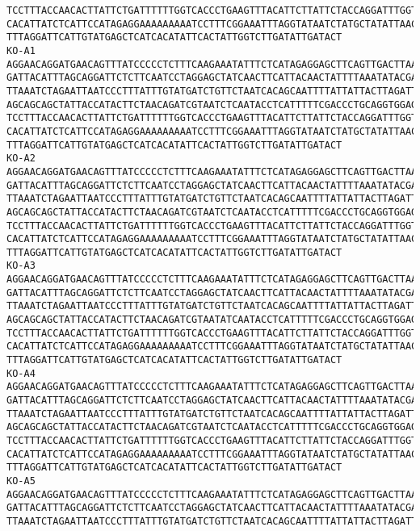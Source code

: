 \documentclass[11pt]{article}
\begin{document}
\begin{Verbatim}[commandchars=\\\{\}]
TCCTTTACCAACACTTATTCTGATTTTTTGGTCACCCTGAAGTTTACATTCTTATTCTACCAGGATTTGGTATTATTTCT
CACATTATCTCATTCCATAGAGGAAAAAAAAATCCTTTCGGAAATTTAGGTATAATCTATGCTATATTAACTATTGGAAT
TTTAGGATTCATTGTATGAGCTCATCACATATTCACTATTGGTCTTGATATTGATACT
KO-A1
AGGAACAGGATGAACAGTTTATCCCCCTCTTTCAAGAAATATTTCTCATAGAGGAGCTTCAGTTGACTTAAGAATCTTCA
GATTACATTTAGCAGGATTCTCTTCAATCCTAGGAGCTATCAACTTCATTACAACTATTTTAAATATACGACCAAAAAAC
TTAAATCTAGAATTAATCCCTTTATTTGTATGATCTGTTCTAATCACAGCAATTTTATTATTACTTAGATTACCAGTCTT
AGCAGCAGCTATTACCATACTTCTAACAGATCGTAATCTCAATACCTCATTTTTCGACCCTGCAGGTGGAGGAGACCCAA
TCCTTTACCAACACTTATTCTGATTTTTTGGTCACCCTGAAGTTTACATTCTTATTCTACCAGGATTTGGTATTATTTCT
CACATTATCTCATTCCATAGAGGAAAAAAAAATCCTTTCGGAAATTTAGGTATAATCTATGCTATATTAACTATTGGAAT
TTTAGGATTCATTGTATGAGCTCATCACATATTCACTATTGGTCTTGATATTGATACT
KO-A2
AGGAACAGGATGAACAGTTTATCCCCCTCTTTCAAGAAATATTTCTCATAGAGGAGCTTCAGTTGACTTAAGAATCTTCA
GATTACATTTAGCAGGATTCTCTTCAATCCTAGGAGCTATCAACTTCATTACAACTATTTTAAATATACGACCAAAAAAC
TTAAATCTAGAATTAATCCCTTTATTTGTATGATCTGTTCTAATCACAGCAATTTTATTATTACTTAGATTACCAGTCTT
AGCAGCAGCTATTACCATACTTCTAACAGATCGTAATCTCAATACCTCATTTTTCGACCCTGCAGGTGGAGGAGACCCAA
TCCTTTACCAACACTTATTCTGATTTTTTGGTCACCCTGAAGTTTACATTCTTATTCTACCAGGATTTGGTATTATTTCT
CACATTATCTCATTCCATAGAGGAAAAAAAAATCCTTTCGGAAATTTAGGTATAATCTATGCTATATTAACTATTGGAAT
TTTAGGATTCATTGTATGAGCTCATCACATATTCACTATTGGTCTTGATATTGATACT
KO-A3
AGGAACAGGATGAACAGTTTATCCCCCTCTTTCAAGAAATATTTCTCATAGAGGAGCTTCAGTTGACTTAAGAATCTTCA
GATTACATTTAGCAGGATTCTCTTCAATCCTAGGAGCTATCAACTTCATTACAACTATTTTAAATATACGACCAAAAAAC
TTAAATCTAGAATTAATCCCTTTATTTGTATGATCTGTTCTAATCACAGCAATTTTATTATTACTTAGATTACCAGTCTT
AGCAGCAGCTATTACCATACTTCTAACAGATCGTAATATCAATACCTCATTTTTCGACCCTGCAGGTGGAGGAGACCCAA
TCCTTTACCAACACTTATTCTGATTTTTTGGTCACCCTGAAGTTTACATTCTTATTCTACCAGGATTTGGTATTATTTCT
CACATTATCTCATTCCATAGAGGAAAAAAAAATCCTTTCGGAAATTTAGGTATAATCTATGCTATATTAACTATTGGAAT
TTTAGGATTCATTGTATGAGCTCATCACATATTCACTATTGGTCTTGATATTGATACT
KO-A4
AGGAACAGGATGAACAGTTTATCCCCCTCTTTCAAGAAATATTTCTCATAGAGGAGCTTCAGTTGACTTAAGAATCTTCA
GATTACATTTAGCAGGATTCTCTTCAATCCTAGGAGCTATCAACTTCATTACAACTATTTTAAATATACGACCAAAAAAC
TTAAATCTAGAATTAATCCCTTTATTTGTATGATCTGTTCTAATCACAGCAATTTTATTATTACTTAGATTACCAGTCTT
AGCAGCAGCTATTACCATACTTCTAACAGATCGTAATCTCAATACCTCATTTTTCGACCCTGCAGGTGGAGGAGACCCAA
TCCTTTACCAACACTTATTCTGATTTTTTGGTCACCCTGAAGTTTACATTCTTATTCTACCAGGATTTGGTATTATTTCT
CACATTATCTCATTCCATAGAGGAAAAAAAAATCCTTTCGGAAATTTAGGTATAATCTATGCTATATTAACTATTGGAAT
TTTAGGATTCATTGTATGAGCTCATCACATATTCACTATTGGTCTTGATATTGATACT
KO-A5
AGGAACAGGATGAACAGTTTATCCCCCTCTTTCAAGAAATATTTCTCATAGAGGAGCTTCAGTTGACTTAAGAATCTTCA
GATTACATTTAGCAGGATTCTCTTCAATCCTAGGAGCTATCAACTTCATTACAACTATTTTAAATATACGACCAAAAAAC
TTAAATCTAGAATTAATCCCTTTATTTGTATGATCTGTTCTAATCACAGCAATTTTATTATTACTTAGATTACCAGTCTT

\end{Verbatim}
\end{document}

